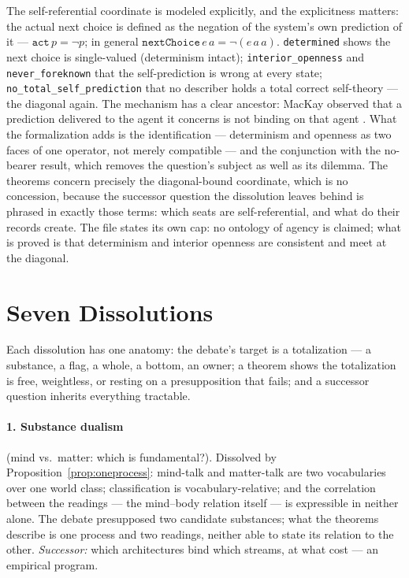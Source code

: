 \documentclass[11pt]{article}
\theoremstyle{remark}
\newcommand{\lf}[1]{\texttt{#1}}       %
\begin{document}
The self-referential coordinate is modeled explicitly, and the explicitness matters: the actual next choice is defined as the negation of the system's own prediction of it --- $\lf{act}\,p = \lnot p$; in general $\lf{nextChoice}\,e\,a = \lnot(e\,a\,a)$. \lf{determined} shows the next choice is single-valued (determinism intact); \lf{interior\_openness} and \lf{never\_foreknown} that the self-prediction is wrong at every state; \lf{no\_total\_self\_prediction} that no describer holds a total correct self-theory --- the diagonal again. The mechanism has a clear ancestor: MacKay observed that a prediction delivered to the agent it concerns is not binding on that agent \cite{mackay1960}. What the formalization adds is the identification --- determinism and openness as two faces of one operator, not merely compatible --- and the conjunction with the no-bearer result, which removes the question's subject as well as its dilemma. The theorems concern precisely the diagonal-bound coordinate, which is no concession, because the successor question the dissolution leaves behind is phrased in exactly those terms: which seats are self-referential, and what do their records create. The file states its own cap: no ontology of agency is claimed; what is proved is that determinism and interior openness are consistent and meet at the diagonal.

\section{Seven Dissolutions}\label{sec:dissolved}

Each dissolution has one anatomy: the debate's target is a totalization --- a substance, a flag, a whole, a bottom, an owner; a theorem shows the totalization is free, weightless, or resting on a presupposition that fails; and a successor question inherits everything tractable.

\paragraph{1. Substance dualism} (mind vs.\ matter: which is fundamental?). Dissolved by Proposition~\ref{prop:oneprocess}: mind-talk and matter-talk are two vocabularies over one world class; classification is vocabulary-relative; and the correlation between the readings --- the mind--body relation itself --- is expressible in neither alone. The debate presupposed two candidate substances; what the theorems describe is one process and two readings, neither able to state its relation to the other. \emph{Successor:} which architectures bind which streams, at what cost --- an empirical program.
\end{document}
